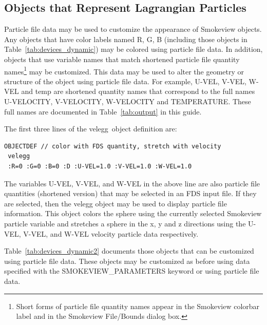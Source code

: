 \subsection{Objects that Represent Lagrangian Particles}
\label{info:SMOKEVIEW_PART}

Particle file data may be used to customize the appearance of Smokeview objects.  Any objects that have color
labels named {\ct R}, {\ct G}, {\ct B} (including those objects in Table~\ref{tab:devices_dynamic}) may be
colored using particle file data.  In addition, objects that use variable names that match shortened
particle file quantity names\footnote{Short forms of particle file quantity names appear in the Smokeview colorbar label
and in the Smokeview File/Bounds dialog box.}
may be customized.  This data may be used to alter the geometry or structure of the object
using particle file data.  For example, {\ct U-VEL}, {\ct V-VEL}, {\ct W-VEL} and {\ct temp} are shortened
quantity names that correspond to the full names {\ct U-VELOCITY}, {\ct V-VELOCITY}, {\ct W-VELOCITY} and
{\ct TEMPERATURE}.  These full names are documented in Table~\ref{tab:output} in this guide.

The first three lines of the {\ct velegg}\ object definition are:
\begin{lstlisting}
OBJECTDEF // color with FDS quantity, stretch with velocity
 velegg
 :R=0 :G=0 :B=0 :D :U-VEL=1.0 :V-VEL=1.0 :W-VEL=1.0
\end{lstlisting}
The variables {\ct U-VEL}, {\ct V-VEL}, and {\ct W-VEL} in the above line are also particle file quantities (shortened version) that may be
selected in an FDS input file.  If they are selected, then the {\ct velegg} object may be used to display
particle file information. This  object colors the sphere using the currently selected Smokeview particle
variable and stretches a sphere in the x, y and z directions using the {\ct U-VEL}, {\ct V-VEL}, and {\ct W-VEL}
velocity particle data respectively.

Table~\ref{tab:devices_dynamic2} documents those objects that can be customized
using particle file data.  These objects may be customized as before using data specified with the {\ct SMOKEVIEW\_PARAMETERS}
keyword or using particle file data.

